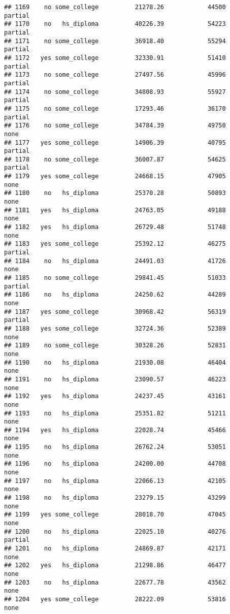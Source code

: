 \documentclass[
]{article}
\begin{document}
\begin{verbatim}
## 1169    no some_college          21278.26            44500     partial
## 1170    no   hs_diploma          40226.39            54223     partial
## 1171    no some_college          36918.40            55294     partial
## 1172   yes some_college          32330.91            51410     partial
## 1173    no some_college          27497.56            45996     partial
## 1174    no some_college          34808.93            55927     partial
## 1175    no some_college          17293.46            36170     partial
## 1176    no some_college          34784.39            49750        none
## 1177   yes some_college          14906.39            40795     partial
## 1178    no some_college          36007.87            54625     partial
## 1179   yes some_college          24668.15            47905        none
## 1180    no   hs_diploma          25370.28            50893        none
## 1181   yes   hs_diploma          24763.05            49188        none
## 1182   yes   hs_diploma          26729.48            51748        none
## 1183   yes some_college          25392.12            46275     partial
## 1184    no   hs_diploma          24491.03            41726        none
## 1185    no some_college          29841.45            51033     partial
## 1186    no   hs_diploma          24250.62            44289        none
## 1187   yes some_college          30968.42            56319     partial
## 1188   yes some_college          32724.36            52389        none
## 1189    no some_college          30328.26            52831        none
## 1190    no   hs_diploma          21930.08            46404        none
## 1191    no   hs_diploma          23090.57            46223        none
## 1192   yes   hs_diploma          24237.45            43161        none
## 1193    no   hs_diploma          25351.82            51211        none
## 1194   yes   hs_diploma          22028.74            45466        none
## 1195    no   hs_diploma          26762.24            53051        none
## 1196    no   hs_diploma          24200.00            44708        none
## 1197    no   hs_diploma          22066.13            42105        none
## 1198    no   hs_diploma          23279.15            43299        none
## 1199   yes some_college          28018.70            47045        none
## 1200    no   hs_diploma          22025.10            40276     partial
## 1201    no   hs_diploma          24869.87            42171        none
## 1202   yes   hs_diploma          21298.86            46477        none
## 1203    no   hs_diploma          22677.78            43562        none
## 1204   yes some_college          28222.09            53816        none

\end{verbatim}
\end{document}
